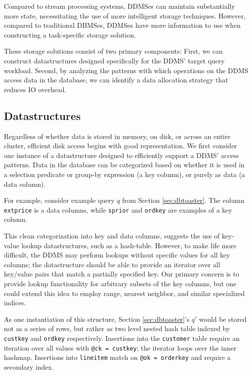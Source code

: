 Compared to stream processing systems, DDMSes can maintain substantially more state, necessitating the use of more intelligent storage techniques.  However, compared to traditional DBMSes, DDMSes have more information to use when constructing a task-specific storage solution.  

These storage solutions consist of two primary components: First, we can construct datastructures designed specifically for the DDMS' target query workload.  Second, by analyzing the patterns with which operations on the DDMS access data in the database, we can identify a data allocation strategy that reduces IO overhead.

\subsection{Datastructures}
Regardless of whether data is stored in memory, on disk, or across an entire cluster, efficient disk access begins with good representation.  We first consider one instance of a datastructure designed to efficiently support a DDMS' access patterns.  Data in the database can be categorized based on whether it is used in a selection predicate or group-by expression (a key column), or purely as data (a data column).  

For example, consider example query $q$ from Section \ref{sec:dbtoaster}.  The column \texttt{extprice} is a data columns, while \texttt{sprior} and \texttt{ordkey} are examples of a key column.  

This clean categorization into key and data columns, suggests the use of key-value lookup datastructures, such as a hash-table.  However, to make life more difficult, the DDMS may perform lookups without specific values for all key columns; the datastructure should be able to provide an iterator over all key/value pairs that match a partially specified key.  Our primary concern is to provide lookup functionality for arbitrary subsets of the key columns, but one could extend this idea to employ range, nearest neighbor, and similar specialized indices.  


As one instantiation of this structure, Section \ref{sec:dbtoaster}'s $q'$ would be stored not as a series of rows, but rather as two level nested hash table indexed by \texttt{custkey} and \texttt{ordkey} respectively.  Insertions into the \texttt{customer} table require an iteration over all values with \texttt{@ck = custkey}; the iterator loops over the inner hashmap.  Insertions into \texttt{lineitem} match on \texttt{@ok = orderkey} and require a secondary index.  

